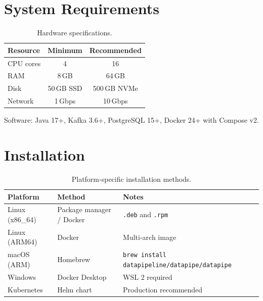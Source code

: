 \documentclass[
    language=english,
    doctype=article,
    institution=none,
]{../../omnilatex}
\begin{document}
\section{System Requirements}
\label{sec:requirements}

\begin{table}[htbp]
    \centering
    \caption{Hardware specifications.}
    \label{tab:hardware}
    \begin{tabular}{@{}lcc@{}}
        \toprule
        \textbf{Resource} & \textbf{Minimum} & \textbf{Recommended} \\
        \midrule
        CPU cores    & 4   & 16   \\
        RAM          & 8\,GB & 64\,GB \\
        Disk         & 50\,GB SSD & 500\,GB NVMe \\
        Network      & 1\,Gbps & 10\,Gbps \\
        \bottomrule
    \end{tabular}
\end{table}

Software: Java 17+, Kafka 3.6+, PostgreSQL 15+, Docker 24+ with Compose v2.

\section{Installation}
\label{sec:installation}

\begin{table}[htbp]
    \centering
    \caption{Platform-specific installation methods.}
    \label{tab:platforms}
    \begin{tabular}{@{}lp{5cm}p{3.5cm}@{}}
        \toprule
        \textbf{Platform} & \textbf{Method} & \textbf{Notes} \\
        \midrule
        Linux (x86\_64)  & Package manager / Docker & \texttt{.deb} and \texttt{.rpm} \\
        Linux (ARM64)    & Docker & Multi-arch image \\
        macOS (ARM)      & Homebrew & \texttt{brew install datapipeline/datapipe/datapipe} \\
        Windows          & Docker Desktop & WSL 2 required \\
        Kubernetes       & Helm chart & Production recommended \\
        \bottomrule
    \end{tabular}
\end{table}
\end{document}
